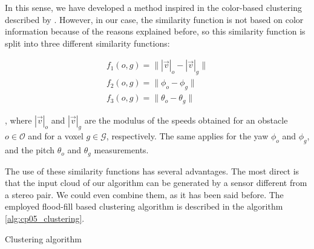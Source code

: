 In this sense, we have developed a method inspired in the color-based clustering described by \cite{broggi2013}. However, in our case, the similarity function is not based on color information because of the reasons explained before, so this similarity function is split into three different similarity functions:

\begin{equation}\label{eq:cp05_similarity_functions}
\begin{array}{l}
f_1(o,g)=\| |\vec{v}|_o - |\vec{v}|_g \|\\
f_2(o,g)=\| \phi_o - \phi_g \|\\
f_3(o,g)=\| \theta_o - \theta_g \|
\end{array}
\end{equation}

, where $|\vec{v}|_o$ and $|\vec{v}|_g$ are the modulus of the speeds obtained for an obstacle $o \in \mathcal{O}$ and for a voxel $g \in \mathcal{G}$, respectively. The same applies for the yaw $\phi_o$ and $\phi_g$, and the pitch $\theta_o$ and $\theta_g$ measurements.

The use of these similarity functions has several advantages. The most direct is that the input cloud of our algorithm can be generated by a sensor different from a stereo pair. We could even combine them, as it has been said before. The employed flood-fill based clustering algorithm is described in the algorithm \ref{alg:cp05_clustering}.

\begin{algorithm}
\caption{Clustering algorithm}
\label{alg:cp05_clustering}
\begin{algorithmic}
 
      \EndIf
    \EndFor
  \EndWhile
  \EndIf
\EndFor
\EndFunction
\end{algorithmic}
\end{algorithm}

